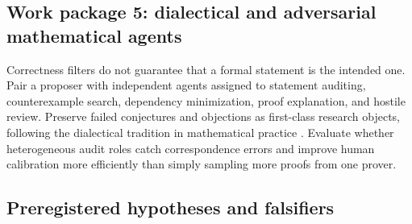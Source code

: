 \documentclass[11pt]{article}
\begin{document}
\subsection{Work package 5: dialectical and adversarial mathematical agents}

Correctness filters do not guarantee that a formal statement is the intended one.  Pair a proposer
with independent agents assigned to statement auditing, counterexample search, dependency
minimization, proof explanation, and hostile review.  Preserve failed conjectures and objections as
first-class research objects, following the dialectical tradition in mathematical practice
\citep{corneli2018}.  Evaluate whether heterogeneous audit roles catch correspondence errors and
improve human calibration more efficiently than simply sampling more proofs from one prover.

\subsection{Preregistered hypotheses and falsifiers}
\end{document}
